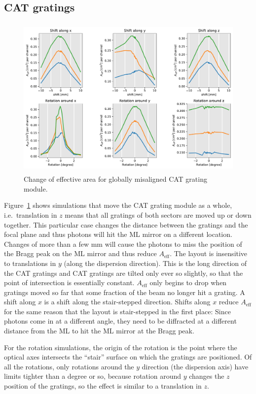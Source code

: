 \documentclass[]{spie}  %
\begin{document}
\subsection{CAT gratings}
\begin{figure} [ht]
  \begin{center}
    \includegraphics[height=8cm]{CAT_global.pdf}
  \end{center}
  \caption
      { \label{fig:CAT_global}Change of effective area for globally misaligned CAT grating module. 
}
\end{figure}
Figure~\ref{fig:CAT_global} shows simulations that move the CAT
grating module as a whole, i.e.\ translation in $z$ means that all
gratings of both sectors are moved up or down together. This
particular case changes the distance between the gratings and the
focal plane and thus photons will hit the ML mirror on a different
location. Changes of more than a few mm will cause the photons to miss
the position of the Bragg peak on the ML mirror and thus reduce
$A_{\mathrm{eff}}$. The layout is insensitive to translations in $y$
(along the dispersion direction). This is the long direction of the
CAT gratings and CAT gratings are tilted only ever so slightly, so
that the point of intersection is essentially
constant. $A_{\mathrm{eff}}$ only begins to drop when gratings
moved so far that some fraction of the beam no longer hit a grating. A
shift along $x$ is a shift along the stair-stepped direction. Shifts
along $x$ reduce $A_{\mathrm{eff}}$ for the same reason that the
layout is stair-stepped in the first place: Since photons come in at a
different angle, they need to be diffracted at a different distance
from the ML to hit the ML mirror at the Bragg peak.

For the rotation simulations, the origin of the rotation is the point
where the optical axes intersects the ``stair'' surface on which the
gratings are positioned. Of all the rotations, only rotations around
the $y$ direction (the dispersion axis) have limits tighter than a
degree or so, because rotation around $y$ changes the $z$ position of
the gratings, so the effect is similar to a translation in $z$.
\end{document}
